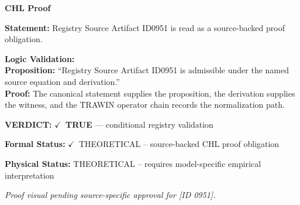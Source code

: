\vspace{0.45em}
\noindent\textbf{CHL Proof}\par
\textbf{Statement:} Registry Source Artifact ID0951 is read as a source-backed proof obligation.

\textbf{Logic Validation:}\\
\textbf{Proposition:} ``Registry Source Artifact ID0951 is admissible under the named source equation and derivation.''\\
\textbf{Proof:} The canonical statement supplies the proposition, the derivation supplies the witness, and the TRAWIN operator chain records the normalization path.

\textbf{VERDICT:} \ensuremath{\checkmark}\ \textbf{TRUE} --- conditional registry validation

\textbf{Formal Status:} \ensuremath{\checkmark}\ THEORETICAL -- source-backed CHL proof obligation

\textbf{Physical Status:} THEORETICAL -- requires model-specific empirical interpretation
\par\vspace{0.45em}
\par
\vfill
\begingroup\footnotesize\itshape
Proof visual pending source-specific approval for [ID 0951].
\par\endgroup
\vfill
\endgroup
\endgroup

